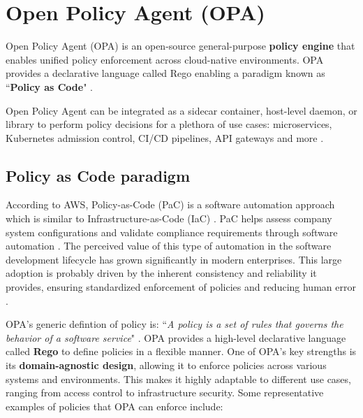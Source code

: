 \newpage

\section{Open Policy Agent (OPA)}

Open Policy Agent (OPA) is an open-source general-purpose \textbf{policy engine} that enables unified policy enforcement across cloud-native environments. OPA provides a declarative language called Rego enabling a paradigm known as ``\textbf{Policy as Code}" \cite{opa_docs}.

Open Policy Agent can be integrated as a sidecar container, host-level daemon, or library to perform policy decisions for a plethora of use cases: microservices, Kubernetes admission control, CI/CD pipelines,  API gateways and more \cite{opa_docs}. 

\subsection{Policy as Code paradigm}

According to AWS, Policy-as-Code (PaC) is a software automation approach which is similar to Infrastructure-as-Code (IaC) \cite{pac_aws}. PaC helps assess company system configurations and validate compliance requirements through software automation \cite{pac_aws}. The perceived value of this type of automation in the software development lifecycle has grown significantly in modern enterprises. This large adoption is probably driven by the inherent consistency and reliability it provides, ensuring standardized enforcement of policies and reducing human error \cite{pac_aws}.

OPA's generic defintion of policy is: ``\textit{A policy is a set of rules that governs the behavior of a software service}" \cite{opa_philosophy}. OPA provides a high-level declarative language called \textbf{Rego} to define policies in a flexible manner. One of OPA's key strengths is its \textbf{domain-agnostic design}, allowing it to enforce policies across various systems and environments. This makes it highly adaptable to different use cases, ranging from access control to infrastructure security. Some representative examples of policies that OPA can enforce include:

